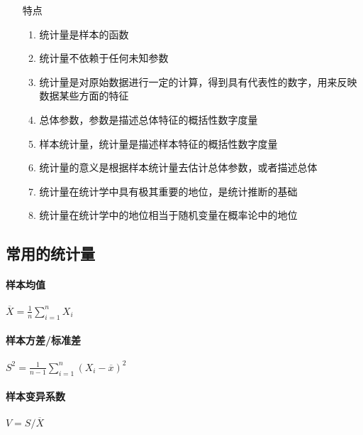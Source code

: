 \documentclass[UTF8,10pt]{book}
\begin{document}
		{\kaishu 
        \begin{itemize}
            \item [特点] {
                \begin{enumerate}
                    \item 统计量是样本的函数
                    \item 统计量不依赖于任何未知参数
                    
                    \item 统计量是对原始数据进行一定的计算，得到具有代表性的数字，用来反映数据某些方面的特征
                   
                    \item 总体参数，参数是描述总体特征的概括性数字度量
                    \item 样本统计量，统计量是描述样本特征的概括性数字度量
                    \item 统计量的意义是根据样本统计量去估计总体参数，或者描述总体
                    
                    \item 统计量在统计学中具有极其重要的地位，是{\kaishu 统计推断}的基础
                    \item 统计量在统计学中的地位相当于{\kaishu 随机变量}在概率论中的地位
                \end{enumerate}
            }
        \end{itemize}
		}

        \subsection{常用的统计量}


            \paragraph{样本均值}  $ \overline{X} = \frac{1}{n} \sum_{i=1}^n X_i $

            \paragraph{样本方差/标准差}  $ S^2 = \frac{1}{n-1}  \sum_{i=1}^n (X_i -\overline{x})^2 $

            \paragraph{样本变异系数}  $ V = S / \overline{X} $ 
\end{document}
